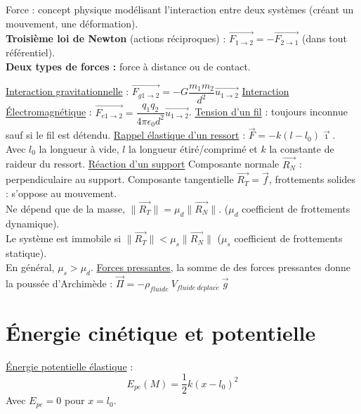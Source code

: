 \documentclass[13pt, twoside, a4paper, french]{report}
\begin{document}
      Force : concept physique modélisant l'interaction entre deux systèmes (créant un mouvement, une déformation).\\
      
      \textbf{Troisième loi de Newton} (actions réciproques) : $\overrightarrow{F_{1\rightarrow2}} = - \overrightarrow{F_{2\rightarrow1}}$ (dans tout référentiel).\\
      
      \textbf{Deux types de forces :} force à distance ou de contact.
      \begin{outline}
        \1 \underline{Interaction gravitationnelle} : $\overrightarrow{F_{g1\rightarrow2}} = - G\dfrac{m_1 m_2}{d^2}\overrightarrow{u_{1\rightarrow2}}$
        \1 \underline{Interaction Électromagnétique} : $\overrightarrow{F_{e1\rightarrow2}} = \dfrac{q_1 q_2}{4\pi\epsilon_0 d^2}\overrightarrow{u_{1\rightarrow2}}$.
        \1 \underline{Tension d'un fil} : toujours inconnue sauf si le fil est détendu.
        \1 \underline{Rappel élastique d'un ressort} : $\vec{F} = - k (l - l_0)\vec{\imath}$.\\Avec $l_0$ la longueur à vide, $l$ la longueur étiré/comprimé et $k$ la constante de raideur du ressort.
        \1 \underline{Réaction d'un support}
        \2 Composante normale $\overrightarrow{R_N}$ : perpendiculaire au support.
        \2 Composante tangentielle $\overrightarrow{R_T} = \overrightarrow{f}$, frottements solides : s'oppose au mouvement.\\Ne dépend que de la masse, $\|\overrightarrow{R_T}\| = \mu_d \|\overrightarrow{R_N}\|$. ($\mu_d$ coefficient de frottements dynamique).\\Le système est immobile si $\|\overrightarrow{R_T}\| < \mu_s \|\overrightarrow{R_N}\|$ ($\mu_s$ coefficient de frottements statique).\\En général, $\mu_s > \mu_d$.
        \1 \underline{Forces pressantes}, la somme de des forces pressantes donne la poussée d'Archimède : $\overrightarrow{\Pi} = - \rho_{fluide}\ V_{fluide \ d\acute eplac\acute e}\ \vec{g}$
      \end{outline}
  
  
  \section{Énergie cinétique et potentielle}\label{sec:energie-cinetique-et-potentielle}
    
    \underline{Énergie potentielle élastique} : \[\displaystyle E_{pe}(M) = \dfrac{1}{2} k (x - l_0)^2\]
    Avec $E_{pe} = 0$ pour $x = l_0$.
  
\end{document}

